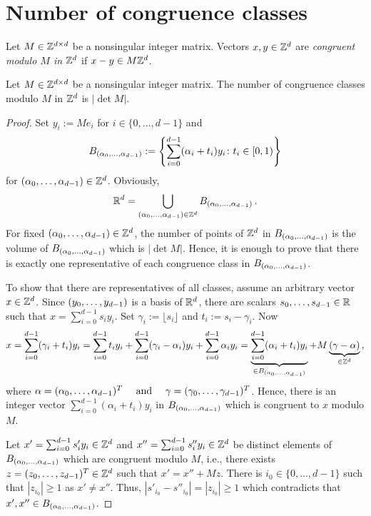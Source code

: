 \section{Number of congruence classes}

\begin{defn}
Let $M\in\mathbb{Z}^{d\times d}$ be a nonsingular integer matrix. Vectors $x,y \in \mathbb{Z}^d$ are \emph{congruent modulo $M$ in $\mathbb{Z}^d$} if $x-y \in M\mathbb{Z}^d$.
\end{defn}
\begin{lem}
Let $M\in\mathbb{Z}^{d\times d}$ be a nonsingular integer matrix. The number of congruence classes modulo $M$ in $\mathbb{Z}^d$ is $|\det M|$.
\label{lem:numCongruenceClasses}
\end{lem}
\begin{proof}
Set $y_i:=M e_i$ for $i\in\{0, \dots, d-1 \}$ and 
$$
B_{({\alpha}_0,\ldots,{\alpha}_{d-1})}:=\left\{\sum_{i=0}^{d-1} (\alpha_i + t_i) y_i \colon t_i \in [0,1)\right\}
$$
for $({\alpha}_0,\ldots,{\alpha}_{d-1}) \in \mathbb{Z}^d$. Obviously,
$$
\mathbb{R}^d=\bigcup_{({\alpha}_0,\ldots,{\alpha}_{d-1}) \in \mathbb{Z}^d} B_{({\alpha}_0,\ldots,{\alpha}_{d-1})}\,.
$$
For fixed $({\alpha}_0,\ldots,{\alpha}_{d-1}) \in \mathbb{Z}^d$, the number of points of $\mathbb{Z}^d$ in $B_{({\alpha}_0,\ldots,{\alpha}_{d-1})}$  is the volume of $B_{({\alpha}_0,\ldots,{\alpha}_{d-1})}$  which is $|\det M|$. Hence, it is enough to prove that there is exactly one representative of each congruence class in $B_{({\alpha}_0,\ldots,{\alpha}_{d-1})}$. 

To show that there are representatives of all classes, assume an arbitrary vector $x\in\mathbb{Z}^d$. Since $({y}_0,\ldots,{y}_{d-1})$ is a basis of $\mathbb{R}^d$, there are scalars $s_0, \dots, s_{d-1}\in \mathbb{R}$ such that $x= \sum_{i=0}^{d-1} s_i y_i$. Set $\gamma_i:=\lfloor s_i \rfloor$ and $t_i:=s_i-\gamma_i$. Now
\begin{align*}
 x=\sum_{i=0}^{d-1} (\gamma_i+t_i) y_i=\sum_{i=0}^{d-1}t_i y_i +\sum_{i=0}^{d-1} (\gamma_i-\alpha_i)y_i + \sum_{i=0}^{d-1} \alpha_i y_i=\underbrace{\sum_{i=0}^{d-1} (\alpha_i+t_i)y_i}_{\in B_{({\alpha}_0,\ldots,{\alpha}_{d-1})} } +M\underbrace{(\gamma-\alpha)}_{\in\mathbb{Z}^d}\,,
\end{align*}
where $\alpha=({\alpha}_0,\ldots,{\alpha}_{d-1})^T \quad \text{ and }\quad \gamma=({\gamma}_0,\ldots,{\gamma}_{d-1})^T$. Hence, there is an integer vector $\sum_{i=0}^{d-1} (\alpha_i+t_i)y_i$ in $B_{({\alpha}_0,\ldots,{\alpha}_{d-1})}$ which is congruent to $x$ modulo $M$.

Let $x'=\sum_{i=0}^{d-1} s'_i y_i \in \mathbb{Z}^d$ and $x''=\sum_{i=0}^{d-1}s''_i y_i \in \mathbb{Z}^d$ be distinct elements of $B_{({\alpha}_0,\ldots,{\alpha}_{d-1})}$ which are congruent modulo $M$, i.e., there exists $z=({z}_0,\ldots,{z}_{d-1})^T\in\mathbb{Z}^d$ such that $x'=x''+M z$. There is $i_0\in\{0, \dots , d-1\}$ such that $|z_{i_0}|\geq 1$ as $x'\neq x''$. Thus, $|s'_{i_0}-s''_{i_0}|=|z_{i_0}|\geq 1$ which contradicts that  $x', x''\in B_{({\alpha}_0,\ldots,{\alpha}_{d-1})}$.
\end{proof}

